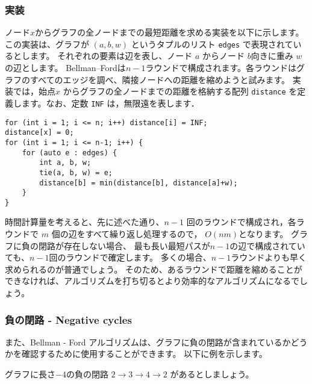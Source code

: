 \subsubsection{実装}

ノード$x$からグラフの全ノードまでの最短距離を求める実装を以下に示します。
この実装は、グラフが $(a, b, w)$ というタプルのリスト \texttt{edges} で表現されているとします。
それぞれの要素は辺を表し、ノード $a$ からノード $b$向きに重み $w$ の辺とします。
Bellman–Fordは$n - 1$ラウンドで構成されます。各ラウンドはグラフのすべてのエッジを調べ、隣接ノードへの距離を縮めようと試みます。
実装では，始点$x$ からグラフの全ノードまでの距離を格納する配列 \texttt{distance} を定義します。なお、定数 \texttt{INF} は，無限遠を表します．

\begin{lstlisting}
for (int i = 1; i <= n; i++) distance[i] = INF;
distance[x] = 0;
for (int i = 1; i <= n-1; i++) {
    for (auto e : edges) {
        int a, b, w;
        tie(a, b, w) = e;
        distance[b] = min(distance[b], distance[a]+w);
    }
}
\end{lstlisting}

時間計算量を考えると、先に述べた通り、$n - 1$ 回のラウンドで構成され，各ラウンドで $m$ 個の辺をすべて繰り返し処理するので，
$O(nm)$となります。
グラフに負の閉路が存在しない場合、
最も長い最短パスが$n - 1$の辺で構成されていても、$n - 1$回のラウンドで確定します。
多くの場合、$n - 1$ラウンドよりも早く求められるのが普通でしょう。
そのため、あるラウンドで距離を縮めることができなければ、アルゴリズムを打ち切るとより効率的なアルゴリズムになるでしょう。

\subsubsection{負の閉路 - Negative cycles}


また、Bellman - Ford アルゴリズムは、グラフに負の閉路が含まれているかどうかを確認するために使用することができます。
以下に例を示します。
\begin{center}
\end{center}
\noindent
グラフに長さ$-4$の負の閉路
$2 \rightarrow 3 \rightarrow 4 \rightarrow 2$
があるとしましょう。

